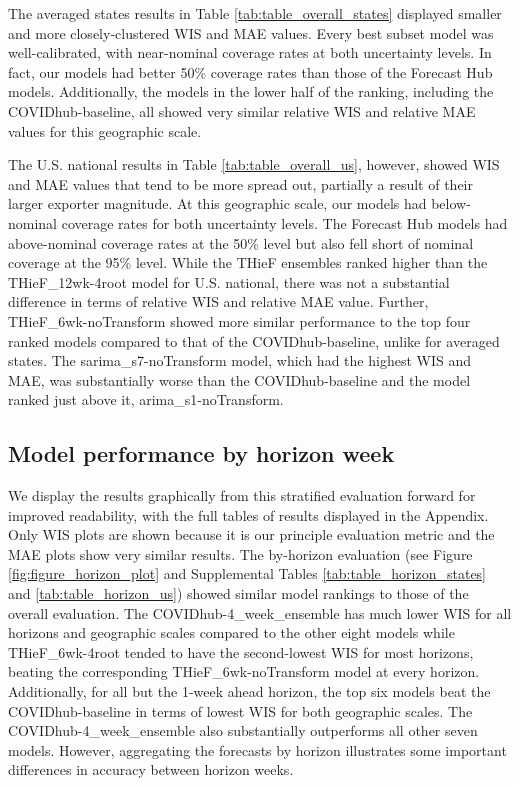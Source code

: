 \documentclass[thesis]{umassthesis}  %
\begin{document}
The averaged states results in Table \ref{tab:table_overall_states} displayed smaller and more closely-clustered WIS and MAE values. Every best subset model was well-calibrated, with near-nominal coverage rates at both uncertainty levels. In fact, our models had better 50\% coverage rates than those of the Forecast Hub models. Additionally, the models in the lower half of the ranking, including the COVIDhub-baseline, all showed very similar relative WIS and relative MAE values for this geographic scale.

The U.S. national results in Table \ref{tab:table_overall_us}, however, showed WIS and MAE values that tend to be more spread out, partially a result of their larger exporter magnitude. At this geographic scale, our models had below-nominal coverage rates for both uncertainty levels. The Forecast Hub models had above-nominal coverage rates at the 50\% level but also fell short of nominal coverage at the 95\% level. While the THieF ensembles ranked higher than the THieF\_12wk-4root model for U.S. national, there was not a substantial difference in terms of relative WIS and relative MAE value. Further, THieF\_6wk-noTransform showed more similar performance to the top four ranked models compared to that of the COVIDhub-baseline, unlike for averaged states. The sarima\_s7-noTransform model, which had the highest WIS and MAE, was substantially worse than the COVIDhub-baseline and the model ranked just above it, arima\_s1-noTransform.

\subsection{Model performance by horizon week} \label{testing_horizon}
We display the results graphically from this stratified evaluation forward for improved readability, with the full tables of results displayed in the Appendix. Only WIS plots are shown because it is our principle evaluation metric and the MAE plots show very similar results. The by-horizon evaluation (see Figure \ref{fig:figure_horizon_plot} and Supplemental Tables \ref{tab:table_horizon_states} and \ref{tab:table_horizon_us}) showed similar model rankings to those of the overall evaluation. The COVIDhub-4\_week\_ensemble has much lower WIS for all horizons and geographic scales compared to the other eight models while THieF\_6wk-4root tended to have the second-lowest WIS for most horizons, beating the corresponding THieF\_6wk-noTransform model at every horizon. Additionally, for all but the 1-week ahead horizon, the top six models beat the COVIDhub-baseline in terms of lowest WIS for both geographic scales. The COVIDhub-4\_week\_ensemble also substantially outperforms all other seven models.  However, aggregating the forecasts by horizon illustrates some important differences in accuracy between horizon weeks.
\end{document}
